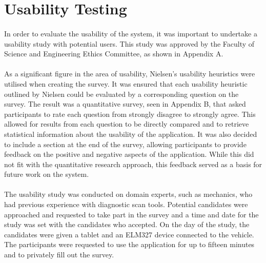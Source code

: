 \section{Usability Testing}{
	\paragraph{}{
	In order to evaluate the usability of the system, it was important to undertake a usability study with potential users. This study was approved by the Faculty of Science and Engineering Ethics Committee, as shown in Appendix A.
	}
	
	\paragraph{}{
	As a significant figure in the area of usability, Nielsen's usability heuristics \cite{Heuristics} were utilised when creating the survey. It was ensured that each usability heuristic outlined by Nielsen could be evaluated by a corresponding question on the survey. The result was a quantitative survey, seen in Appendix B, that asked participants to rate each question from strongly disagree to strongly agree. This allowed for results from each question to be directly compared and to retrieve statistical information about the usability of the application. It was also decided to include a section at the end of the survey, allowing participants to provide feedback on the positive and negative aspects of the application. While this did not fit with the quantitative research approach, this feedback served as a basis for future work on the system.
	}
	
	\paragraph{}{
	The usability study was conducted on domain experts, such as mechanics, who had previous experience with diagnostic scan tools. Potential candidates were approached and requested to take part in the survey and a time and date for the study was set with the candidates who accepted. On the day of the study, the candidates were given a tablet and an ELM327 device connected to the vehicle. The participants were requested to use the application for up to fifteen minutes and to privately fill out the survey.
	}
	
}
